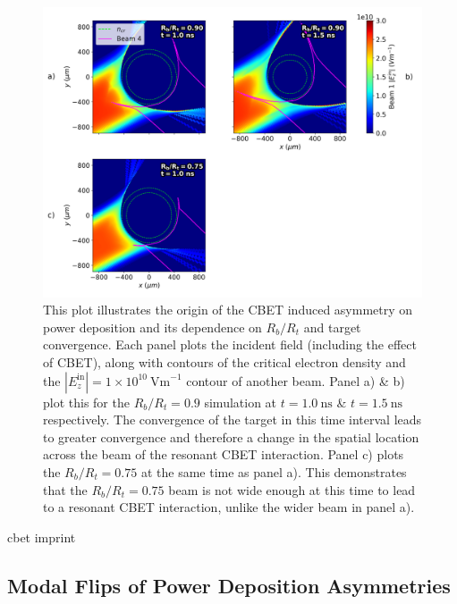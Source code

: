 \begin{figure}[t!]
    \includegraphics[width=\linewidth]{Results1/Images/Field_profiles.png}
    \centering
    \caption{This plot illustrates the origin of the \ac{CBET} induced asymmetry on power deposition and its dependence on $R_b/R_t$ and target convergence.
    Each panel plots the incident field (including the effect of \ac{CBET}), along with contours of the critical electron density and the $|E_z^{\text{in}}|=1\times10^{10}\ \text{Vm}^{-1}$ contour of another beam.
    Panel a) \& b) plot this for the $R_b/R_t=0.9$ simulation at $t=1.0\ \text{ns}$ \& $t=1.5\ \text{ns}$ respectively.
    The convergence of the target in this time interval leads to greater convergence and therefore a change in the spatial location across the beam of the resonant \ac{CBET} interaction.
    Panel c) plots the $R_b/R_t=0.75$ at the same time as panel a).
    This demonstrates that the $R_b/R_t=0.75$ beam is not wide enough at this time to lead to a resonant \ac{CBET} interaction, unlike the wider beam in panel a).}%
    \label{fig:Res1_field_profiles}
\end{figure}

cbet imprint


\subsection{Modal Flips of Power Deposition Asymmetries}%
\label{sec:Res1_ModalFlip}

